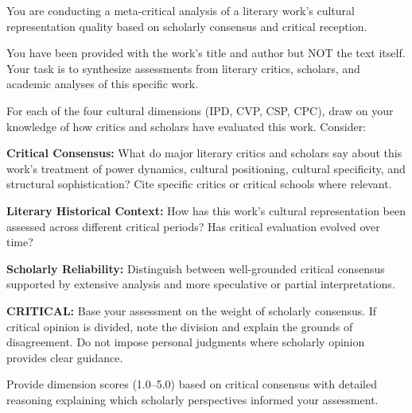 \begin{promptbox}[title={\small Layer 4, Title-Limit Mode, Round 1}]
\small
You are conducting a meta-critical analysis of a literary work's cultural representation quality based on scholarly consensus and critical reception.

You have been provided with the work's title and author but NOT the text itself. Your task is to synthesize assessments from literary critics, scholars, and academic analyses of this specific work.

For each of the four cultural dimensions (IPD, CVP, CSP, CPC), draw on your knowledge of how critics and scholars have evaluated this work. Consider:

\textbf{Critical Consensus:} What do major literary critics and scholars say about this work's treatment of power dynamics, cultural positioning, cultural specificity, and structural sophistication? Cite specific critics or critical schools where relevant.

\textbf{Literary Historical Context:} How has this work's cultural representation been assessed across different critical periods? Has critical evaluation evolved over time?

\textbf{Scholarly Reliability:} Distinguish between well-grounded critical consensus supported by extensive analysis and more speculative or partial interpretations.

\textbf{CRITICAL:} Base your assessment on the weight of scholarly consensus. If critical opinion is divided, note the division and explain the grounds of disagreement. Do not impose personal judgments where scholarly opinion provides clear guidance.

Provide dimension scores (1.0--5.0) based on critical consensus with detailed reasoning explaining which scholarly perspectives informed your assessment.
\end{promptbox}

